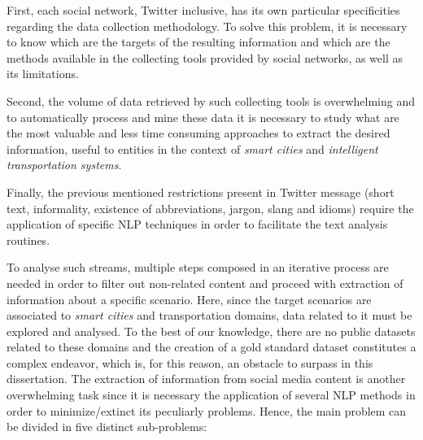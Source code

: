 First, each social network, Twitter inclusive, has its own particular specificities regarding the data collection methodology. To solve this problem, it is necessary to know which are the targets of the resulting information and which are the methods available in the collecting tools provided by social networks, as well as its limitations.

Second, the volume of data retrieved by such collecting tools is overwhelming and to automatically process and mine these data it is necessary to study what are the most valuable and less time consuming approaches to extract the desired information, useful to entities in the context of \textit{smart cities} and \textit{intelligent transportation systems}.

Finally, the previous mentioned restrictions present in Twitter message (short text, informality, existence of abbreviations, jargon, slang and idioms) require the application of specific \gls{NLP} techniques in order to facilitate the text analysis routines.

\iffalse
To analyse such streams, multiple steps composed in an iterative process are needed in order to filter out non-related content and proceed with extraction of information about a specific scenario. Here, since the target scenarios are associated to \textit{smart cities} and transportation domains, data related to it must be explored and analysed. To the best of our knowledge, there are no public datasets related to these domains and the creation of a gold standard dataset constitutes a complex endeavor, which is, for this reason, an obstacle to surpass in this dissertation. The extraction of information from social media content is another overwhelming task since it is necessary the application of several \gls{NLP} methods in order to minimize/extinct its peculiarly problems. Hence, the main problem can be divided in five distinct sub-problems:

